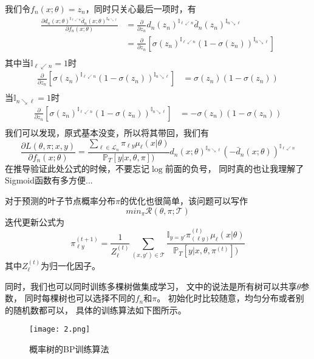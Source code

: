 \documentclass[UTF8]{ctexart}
\begin{document}
我们令$f_n(x;\theta)=z_n$，同时只关心最后一项时，有
$$
\begin{aligned}
\frac{
\partial
d_n(x;\theta)^{\mathbb{I}_{\ell\swarrow n}}
\bar{d}_n(x;\theta)^{\mathbb{I}_{n\searrow\ell}}
}
{\partial f_n(x;\theta)}
&=\frac{\partial}{\partial z_n}
d_n(z_n)^{\mathbb{I}_{\ell\swarrow n}}
\bar{d}_n(z_n)^{\mathbb{I}_{n\searrow\ell}}
\\
&=\frac{\partial}{\partial z_n}
[\sigma(z_n)^{\mathbb{I}_{\ell\swarrow n}}
(1-\sigma(z_n))^{\mathbb{I}_{n\searrow\ell}}]
\\
\end{aligned}
$$
其中当$\mathbb{I}_{\ell\swarrow n}=1$时
$$
\begin{aligned}
\frac{\partial}{\partial z_n}
[\sigma(z_n)^{\mathbb{I}_{\ell\swarrow n}}
(1-\sigma(z_n))^{\mathbb{I}_{n\searrow\ell}}]
&=
\sigma(z_n)(1-\sigma(z_n))
\\
\end{aligned}
$$
当$\mathbb{I}_{n\searrow\ell}=1$时
$$
\begin{aligned}
\frac{\partial}{\partial z_n}
[\sigma(z_n)^{\mathbb{I}_{\ell\swarrow n}}
(1-\sigma(z_n))^{\mathbb{I}_{n\searrow\ell}}]
&=
-\sigma(z_n)(1-\sigma(z_n))\\
\end{aligned}
$$
我们可以发现，原式基本没变，所以将其带回，我们有
$$
\frac{\partial L(\theta,\pi;x,y)}{\partial f_n(x;\theta)}
=
\frac{
\sum_{\ell\in\mathcal{L}_n}\pi_{\ell y}
\mu_{\ell}(x|\theta)
}{\mathbb{P}_{T}[y|x,\theta,\pi])}
d_n(x;\theta)^{\mathbb{I}_{n\searrow\ell}}
(-\bar{d}_n(x;\theta))^{\mathbb{I}_{\ell\swarrow n}}
$$
在推导验证此处公式的时候，不要忘记$\log$前面的负号，
同时真的也让我理解了Sigmoid函数有多方便...

对于预测的叶子节点概率分布$\pi$的优化也很简单，该问题可以写作
$$
min_{\pi}\mathcal{R}(\theta,\pi;\mathcal{T})
$$
迭代更新公式为
$$
\pi^{(t+1)}_{\ell y}=
\frac{1}{Z^{(t)}_\ell}
\sum_{(x,y')\in\mathcal{T}}
\frac{
\mathbb{I}_{y=y'}\pi^{(t)}_{(\ell y)}\mu_{\ell}(x|\theta)
}{\mathbb{P}_{T}[y|x,\theta,\pi^{(t)}])}
$$
其中$Z^{(t)}_\ell$为归一化因子。

同时，我们也可以同时训练多棵树做集成学习，
文中的说法是所有树可以共享$\theta$参数，
同时每棵树也可以选择不同的$f_n$和$\pi$。
初始化时比较随意，均匀分布或者别的随机数都可以，
具体的训练算法如下图所示。

\begin{figure}[htbp]
	\small
	\centering
	\texttt{[image: 2.png]}
	\caption{概率树的BP训练算法}
		\label{1}
\end{figure}
\end{document}
